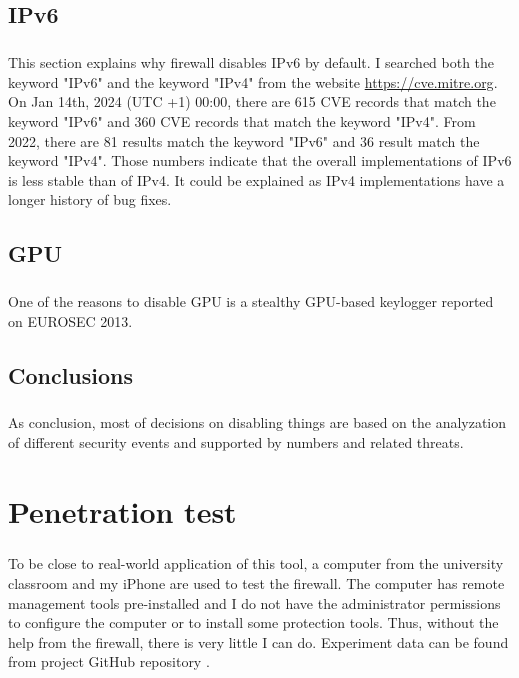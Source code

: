 \documentclass[mscthesis]{usiinfthesis}
\begin{document}
\section{IPv6}
\paragraph{}
This section explains why firewall disables IPv6 by default. I searched both the keyword "IPv6" and the keyword "IPv4" from the website \url{https://cve.mitre.org}. On Jan 14th, 2024 (UTC +1) 00:00, there are 615 CVE records that match the keyword "IPv6" and 360 CVE records that match the keyword "IPv4". From 2022, there are 81 results match the keyword "IPv6" and 36 result match the keyword "IPv4". Those numbers indicate that the overall implementations of IPv6 is less stable than of IPv4. It could be explained as IPv4 implementations have a longer history of bug fixes.

\section{GPU}
\paragraph{}
One of the reasons to disable GPU is a stealthy GPU-based keylogger reported on EUROSEC 2013. \citep{gpu:keylogger}

\section{Conclusions}
\paragraph{}
As conclusion, most of decisions on disabling things are based on the analyzation of different security events and supported by numbers and related threats.

\chapter{Penetration test}\label{cha:test}
\paragraph{}
To be close to real-world application of this tool, a computer from the university classroom and my iPhone are used to test the firewall. The computer has remote management tools pre-installed and I do not have the administrator permissions to configure the computer or to install some protection tools. Thus, without the help from the firewall, there is very little I can do. Experiment data can be found from project GitHub repository \citep{hood:github}.
\end{document}
